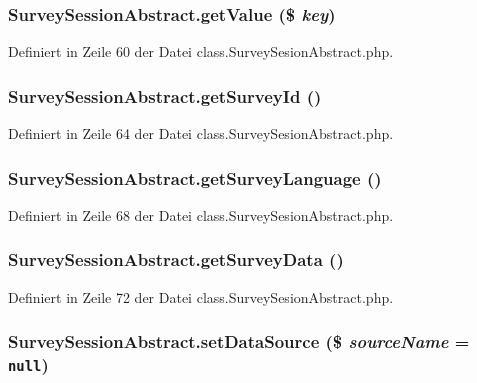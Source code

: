\subsubsection{\setlength{\rightskip}{0pt plus 5cm}SurveySessionAbstract.getValue (\$ {\em key})}\label{classSurveySessionAbstract_d9c7b4c57e0195ad8cc8d06d74dabdf1}




Definiert in Zeile 60 der Datei class.SurveySesionAbstract.php.
\subsubsection{\setlength{\rightskip}{0pt plus 5cm}SurveySessionAbstract.getSurveyId ()}\label{classSurveySessionAbstract_8fac73c7e4620ff8b0f51920fa478d01}




Definiert in Zeile 64 der Datei class.SurveySesionAbstract.php.
\subsubsection{\setlength{\rightskip}{0pt plus 5cm}SurveySessionAbstract.getSurveyLanguage ()}\label{classSurveySessionAbstract_c86ecd3e5cd38f188ff3fb559ef3c31d}




Definiert in Zeile 68 der Datei class.SurveySesionAbstract.php.
\subsubsection{\setlength{\rightskip}{0pt plus 5cm}SurveySessionAbstract.getSurveyData ()}\label{classSurveySessionAbstract_1b1eafce27d7f1a18c568a111632a6f5}




Definiert in Zeile 72 der Datei class.SurveySesionAbstract.php.
\subsubsection{\setlength{\rightskip}{0pt plus 5cm}SurveySessionAbstract.setDataSource (\$ {\em sourceName} = {\tt null})}\label{classSurveySessionAbstract_41ea18a25309c6c3e3e7f3883c79d022}




